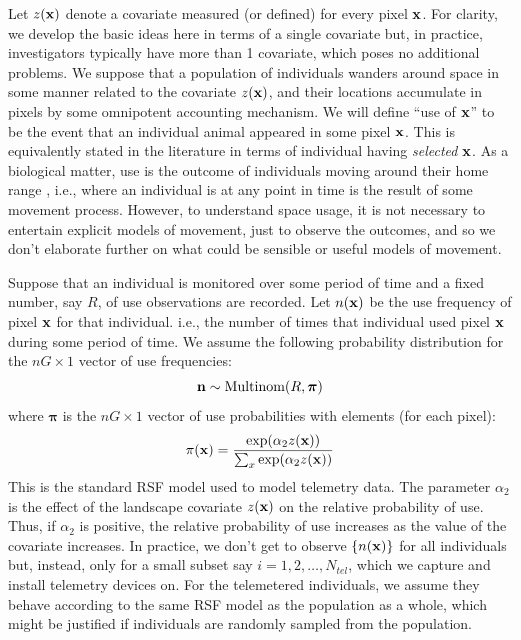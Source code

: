 \documentclass[12pt]{article}
\begin{document}
Let $z({\bf x})$ denote a covariate measured (or defined) for every
pixel ${\bf x}$. For clarity, we develop the basic ideas here in terms of a
single covariate but, in practice, investigators typically have more
than 1 covariate, which poses no additional problems.
We suppose that a population of individuals wanders around space in
some manner related to the covariate $z({\bf x})$, and their locations
accumulate in pixels by some omnipotent accounting mechanism. We will
define ``use of ${\bf x}$'' to be the event that an individual animal
appeared in some pixel ${\bf x}$.
This is equivalently stated in the
literature in terms of individual having {\it selected} ${\bf  x}$.
 As a biological matter,
use is the outcome of individuals moving around their home range \citep{hooten_etal:2010},
i.e., where an individual is at any point in time is the result of
some movement process. However, to understand space usage, it is not
necessary to entertain explicit models of movement, just to observe
the outcomes, and so we don't elaborate further on what could be
sensible or useful models of movement.

Suppose that an individual  is monitored over some period of time
and a fixed number, say $R$, of use observations are recorded.
Let $n({\bf x})$ be the use frequency of pixel ${\bf x}$ for that individual.
i.e., the number of times that individual used pixel ${\bf x}$
during some period of time.
We assume the
following probability distribution for the $nG \times 1$ vector of use
frequencies:
\[
{\bf n} \sim \mbox{Multinom}(R, {\bm \pi})
\]
where ${\bm \pi}$ is the $nG \times 1$ vector of use probabilities
with elements (for each pixel):
\[
 \pi({\bf x}) = \frac{ \exp( \alpha_{2} z({\bf x}) ) }
   { \sum_{x}    \exp(\alpha_{2} z({\bf x})) }
\]
This is the standard RSF model \citep{manly_etal:2002} used to model
telemetry data.
The parameter $\alpha_2$ is the effect of the
landscape covariate $z({\bf x})$ on the relative probability of
use. Thus, if $\alpha_2$ is positive, the relative probability of use
increases as the value of the covariate increases.
In practice, we don't get to
observe $\{ n({\bf x}) \}$ for all individuals but, instead, only for a small
subset say $i=1,2,\ldots, N_{tel}$,  which we capture and install telemetry devices on.
For the telemetered individuals, we assume they behave according
to the same RSF model as the population as a whole, which might be
justified if individuals are randomly sampled from the population.
\end{document}
